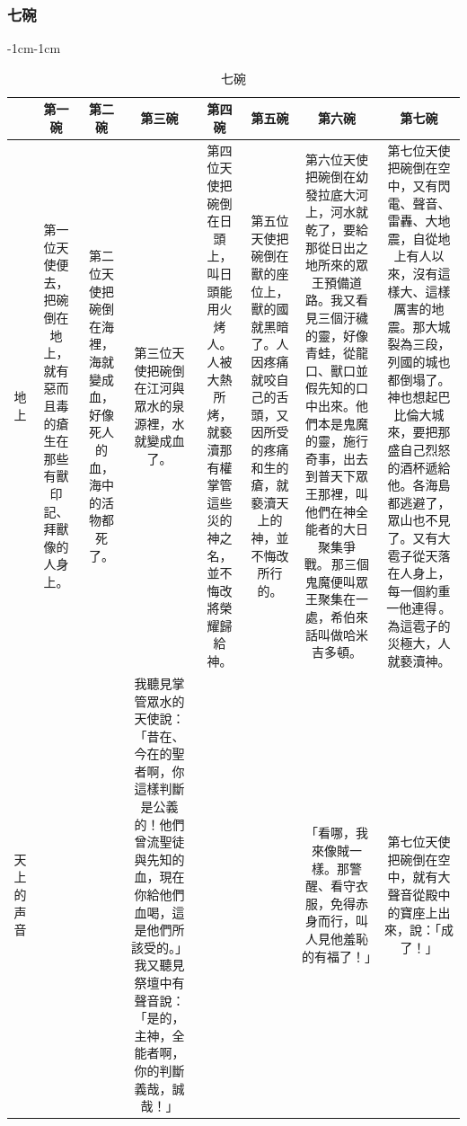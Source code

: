  \subsubsection{七碗}
 \begin{changemargin}{-1cm}{-1cm}
\begin{table} %
\centering
\begin{tabular}{cccccccc}\hline
&第一碗 & 第二碗 & 第三碗&第四碗 & 第五碗&第六碗  & 第七碗  \\\hline
\multicolumn{1}{m{.3cm}|}{地上}&
\multicolumn{1}{m{2cm}|}{第一位天使便去，把碗倒在地上，就有惡而且毒的瘡生在那些有獸印記、拜獸像的人身上。}  &
\multicolumn{1}{m{2cm}|}{第二位天使把碗倒在海裡，海就變成血，好像死人的血，海中的活物都死了。}  &
 \multicolumn{1}{m{3cm}|}{第三位天使把碗倒在江河與眾水的泉源裡，水就變成血了。 } &
 \multicolumn{1}{m{2cm}|}{第四位天使把碗倒在日頭上，叫日頭能用火烤人。人被大熱所烤，就褻瀆那有權掌管這些災的神之名，並不悔改將榮耀歸給神。}  &
 \multicolumn{1}{m{2cm}|}{第五位天使把碗倒在獸的座位上，獸的國就黑暗了。人因疼痛就咬自己的舌頭，又因所受的疼痛和生的瘡，就褻瀆天上的神，並不悔改所行的。}   &
 \multicolumn{1}{m{5.cm}|}{第六位天使把碗倒在幼發拉底大河上，河水就乾了，要給那從日出之地所來的眾王預備道路。我又看見三個汙穢的靈，好像青蛙，從龍口、獸口並假先知的口中出來。他們本是鬼魔的靈，施行奇事，出去到普天下眾王那裡，叫他們在神全能者的大日聚集爭戰。 那三個鬼魔便叫眾王聚集在一處，希伯來話叫做哈米吉多頓。}  &  
 
 \multicolumn{1}{m{3.5cm}|}{第七位天使把碗倒在空中，又有閃電、聲音、雷轟、大地震，自從地上有人以來，沒有這樣大、這樣厲害的地震。那大城裂為三段，列國的城也都倒塌了。神也想起巴比倫大城來，要把那盛自己烈怒的酒杯遞給他。各海島都逃避了，眾山也不見了。又有大雹子從天落在人身上，每一個約重一他連得 。為這雹子的災極大，人就褻瀆神。} \\\hline
 
 
 \multicolumn{1}{m{.3cm}|}{天上的声音}&
\multicolumn{1}{m{2cm}|}{}  &
\multicolumn{1}{m{2cm}|}{}  &
 \multicolumn{1}{m{3cm}|}{我聽見掌管眾水的天使說：「昔在、今在的聖者啊，你這樣判斷是公義的！他們曾流聖徒與先知的血，現在你給他們血喝，這是他們所該受的。」我又聽見祭壇中有聲音說：「是的，主神，全能者啊，你的判斷義哉，誠哉！」} &
 \multicolumn{1}{m{2cm}|}{}  &
 \multicolumn{1}{m{2cm}|}{}   &
 \multicolumn{1}{m{5.cm}|}{「看哪，我來像賊一樣。那警醒、看守衣服，免得赤身而行，叫人見他羞恥的有福了！」 }  &  
 \multicolumn{1}{m{3.5cm}|}{第七位天使把碗倒在空中，就有大聲音從殿中的寶座上出來，說：「成了！」 } \\\hline
\end{tabular}
\caption{七碗}
\end{table} 
\end{changemargin}
 